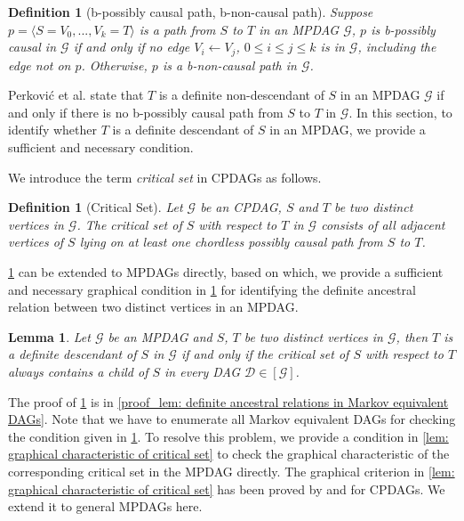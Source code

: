 \documentclass{article}
\newtheorem{lemma}[theorem]{Lemma}
\newtheorem{definition}[theorem]{Definition}
\begin{document}
\begin{definition} [b-possibly causal path, b-non-causal path] \citep[Definition 3.1]{perkovic2017interpreting}\label{b-path}
    Suppose $p=\langle S=V_{0},..., V_{k}=T\rangle $ is a path from $S$ to $T$ in an MPDAG $\mathcal{G}$, $p$ is b-possibly causal in $\mathcal{G}$ if and only if no edge $V_i \leftarrow V_j$, $0 \leq i \le j \leq k $ is in $\mathcal{G}$, including the edge not on $p$. Otherwise, $p$ is a b-non-causal path in $\mathcal{G}$.
\end{definition}

Perkovi{\'c} et al. \citep{perkovic2017interpreting} state that $T$ is a definite non-descendant of $S$ in an MPDAG $\mathcal{G}$ if and only if there is no b-possibly causal path from $S$ to $T$ in $\mathcal{G}$. In this section, to identify whether $T$ is a definite descendant of $S$ in an MPDAG, we provide a sufficient and necessary condition. 

We introduce the term \textit{critical set} \citep{fang2020ida} in CPDAGs as follows. 
\begin{definition} [Critical Set] \citep[Definition 2]{fang2020ida} \label{def: Critical Set}
    Let $\mathcal G$ be an CPDAG, $S$ and $T$ be two distinct vertices in $\mathcal G$. The critical set of $S$ with respect to $T$ in $\mathcal G$ consists of all adjacent vertices of $S$ lying on at least one chordless possibly causal path from $S$ to $T$.
\end{definition}
\cref{def: Critical Set} can be extended to MPDAGs directly,
based on which, we provide a sufficient and necessary graphical condition in \cref{lem: definite ancestral relations in Markov equivalent DAGs} for identifying the definite ancestral relation between two distinct vertices in an MPDAG. %

\begin{lemma}\label{lem: definite ancestral relations in Markov equivalent DAGs}
    Let $\mathcal G$ be an MPDAG and $S$, $T$ be two distinct vertices in $\mathcal G$, then $T$ is a definite descendant of $S$ in $\mathcal G$ if and only if the critical set of $S$ with respect to $T$ always contains a child of $S$ in every DAG $\mathcal D \in [\mathcal G]$.
\end{lemma}

The proof of \cref{lem: definite ancestral relations in Markov equivalent DAGs} is in \cref{proof_lem: definite ancestral relations in Markov equivalent DAGs}. Note that we have to enumerate all Markov equivalent DAGs for checking the condition given in \cref{lem: definite ancestral relations in Markov equivalent DAGs}. To resolve this problem, we provide a condition in \cref{lem: graphical characteristic of critical set} to check the graphical characteristic of the corresponding critical set in the MPDAG directly. The graphical criterion in \cref{lem: graphical characteristic of critical set} has been proved by \cite[Lemma 2]{fang2022local} and \cite[Lemma 1]{chen2021definite} for CPDAGs. We extend it to general MPDAGs here. 
\end{document}
